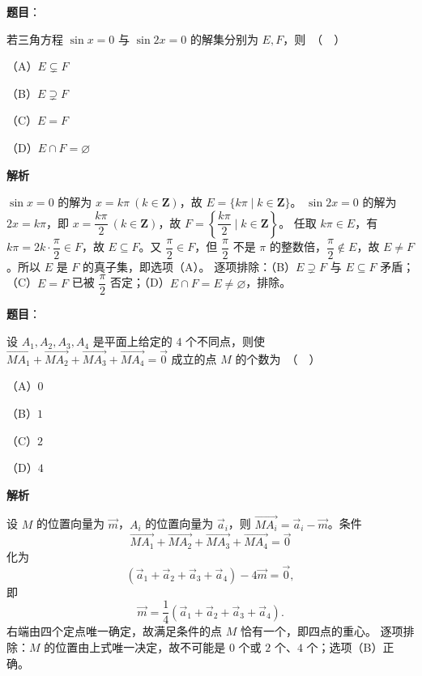 \begin{answer}

\textbf{题目}：

若三角方程 $\sin x=0$ 与 $\sin 2x=0$ 的解集分别为 $E,F$，则　（　）

（A）$E\subsetneq F$

（B）$E\supsetneq F$

（C）$E=F$

（D）$E\cap F=\varnothing$

\textbf{解析}

$\sin x=0$ 的解为 $x=k\pi\ (k\in\mathbf Z)$，故 $E=\{k\pi\mid k\in\mathbf Z\}$。
$\sin2x=0$ 的解为 $2x=k\pi$，即 $x=\dfrac{k\pi}{2}\ (k\in\mathbf Z)$，故 $F=\left\{\dfrac{k\pi}{2}\mid k\in\mathbf Z\right\}$。
任取 $k\pi\in E$，有 $k\pi=2k\cdot\dfrac\pi2\in F$，故 $E\subseteq F$。又 $\dfrac\pi2\in F$，但 $\dfrac\pi2$ 不是 $\pi$ 的整数倍，$\dfrac\pi2\notin E$，故 $E\neq F$。所以 $E$ 是 $F$ 的真子集，即选项（A）。
逐项排除：（B）$E\supsetneq F$ 与 $E\subseteq F$ 矛盾；（C）$E=F$ 已被 $\dfrac\pi2$ 否定；（D）$E\cap F=E\neq\varnothing$，排除。


\end{answer}
\begin{answer}

\textbf{题目}：

设 $A_1,A_2,A_3,A_4$ 是平面上给定的 $4$ 个不同点，则使 $\overrightarrow{MA_1}+\overrightarrow{MA_2}+\overrightarrow{MA_3}+\overrightarrow{MA_4}=\vec 0$ 成立的点 $M$ 的个数为　（　）

（A）$0$

（B）$1$

（C）$2$

（D）$4$

\textbf{解析}

设 $M$ 的位置向量为 $\vec m$，$A_i$ 的位置向量为 $\vec a_i$，则 $\overrightarrow{MA_i}=\vec a_i-\vec m$。条件
\nopagebreak[4]
\[\overrightarrow{MA_1}+\overrightarrow{MA_2}+\overrightarrow{MA_3}+\overrightarrow{MA_4}=\vec 0\]
化为
\nopagebreak[4]
\[\left(\vec a_1+\vec a_2+\vec a_3+\vec a_4\right)-4\vec m=\vec 0,\]
即
\nopagebreak[4]
\[\vec m=\frac14\left(\vec a_1+\vec a_2+\vec a_3+\vec a_4\right).\]
右端由四个定点唯一确定，故满足条件的点 $M$ 恰有一个，即四点的重心。
逐项排除：$M$ 的位置由上式唯一决定，故不可能是 $0$ 个或 $2$ 个、$4$ 个；选项（B）正确。


\end{answer}
